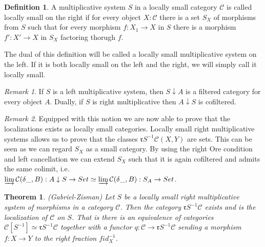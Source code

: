 \documentclass[12pt]{article}
\newtheorem{theorem}{Theorem}[section]
\theoremstyle{definition}
\newtheorem{definition}{Definition}[section]
\theoremstyle{remark}
\newtheorem*{remark}{Remark}
\begin{document}
            \begin{definition}
                A multiplicative system $S$ in a locally small category $\mathcal{C}$ is called locally small on the right if for every object $X:\mathcal{C}$ there is a set $S_X$ of morphisms from $S$ such that for every morphism $f : X_1 \rightarrow X$ in $S$ there is a morphism $f' : X'\rightarrow X$ in $S_X$ factoring thorugh $f$.

                The dual of this definition will be called a locally small multiplicative system on the left. If it is both locally small on the left and the right, we will simply call it locally small. 
            \end{definition}

            \begin{remark}
                If $S$ is a left multiplicative system, then $S\downarrow A$ is a filtered category for every object $A$. Dually, if $S$ is right multiplicative then $A\downarrow S$ is cofiltered.
            \end{remark}

            \begin{remark}
                Equipped with this notion we are now able to prove that the localizations exists as locally small categories. Locally small right multiplicative systems allows us to prove that the classes $\mathfrak{r}S^{-1}\mathcal{C}(X,Y)$ are sets. This can be seen as we can regard $S_X$ as a small category. By using the right Ore condition and left cancellation we can extend $S_X$ such that it is again cofiltered and admits the same colimit, i.e.\\
                 $\varinjlim\mathcal{C}(\delta\_,B):A\downarrow S\rightarrow Set\simeq\varinjlim\mathcal{C}(\delta\_,B):S_A\rightarrow Set$. 
            \end{remark}

            \begin{theorem}
                (Gabriel-Zisman) Let $S$ be a locally small right multiplicative system of morphisms in a category $\mathcal{C}$. Then the category $\mathfrak{r}S^{-1}\mathcal{C}$ exists and is the localization of $\mathcal{C}$ on $S$. That is there is an equivalence of categories $\mathcal{C}[S^{-1}]\simeq\mathfrak{r}S^{-1}\mathcal{C}$ together with a functor $q: \mathcal{C}\rightarrow\mathfrak{r}S^{-1}\mathcal{C}$ sending a morphism $f : X\rightarrow Y$ to the right fraction $fid_X^{-1}$.
            \end{theorem}
\end{document}
